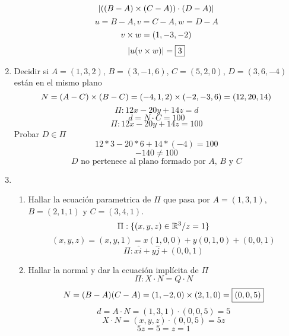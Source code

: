 \documentclass[../practica.root.tex]{subfiles}
\begin{document}
\begin{enumerate}
          \[ | ((B-A)\times(C-A))\cdot(D-A) | \]
          \[ u = B - A, v = C - A, w = D - A \]
          \[ v\times w = (1, -3, -2) \]
          \[ | u(v \times w) | = \boxed{3} \]

    \item Decidir si $A = (1,3,2)$, $B = (3,-1,6)$, $C = (5,2,0)$, $D = (3,6,-4)$ están en el mismo plano
          \[ N = (A-C) \times (B-C) = (-4,1,2) \times (-2,-3,6) = (12,20,14) \]
          \[ \Pi: 12x - 20y + 14z = d \]
          \[ d = N \cdot C = 100 \]
          \[ \Pi: 12x - 20y + 14z = 100 \]
          Probar $D \in \Pi$
          \[ 12*3 - 20*6 + 14*(-4) = 100 \]
          \[ -140 \neq 100 \]
          \[ \boxed{\text{$D$ no pertenece al plano formado por $A$, $B$ y $C$}} \]


    \item \begin{enumerate}
              \item Hallar la ecuación parametrica de $\Pi$ que pasa por $A = (1, 3, 1)$, $B = (2, 1, 1)$ y $C = (3, 4, 1)$.
                    \[ \Pi : \{(x, y, z) \in \mathbb{R}^3 / z = 1\} \]
                    \[ (x, y, z) = (x, y, 1) = x(1, 0, 0) + y(0, 1, 0) + (0, 0, 1) \]
                    \[ \boxed{\Pi : x\hat{i} + y\hat{j} + (0, 0, 1)} \]

              \item Hallar la normal y dar la ecuación implícita de $\Pi$
                    \[ \Pi : X \cdot N = Q \cdot N \]
                    \[ N = (B-A)(C-A) = (1,-2,0)\times(2,1,0) = \boxed{(0, 0, 5)} \]
                    \[ d = A \cdot N = (1, 3, 1)\cdot(0, 0, 5) = 5\]
                    \[ X \cdot N = (x, y, z)\cdot(0, 0, 5) = 5z \]
                    \[ 5z = 5 = \boxed{z = 1} \]


\end{enumerate}
\end{enumerate}
\end{document}
